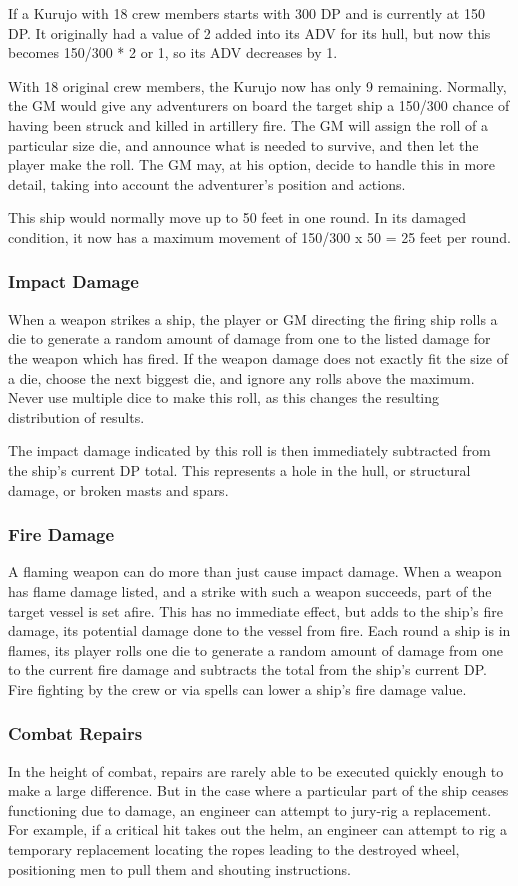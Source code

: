 If a Kurujo with 18 crew members starts with 300 DP and is currently at 150 DP. It originally had a value of 2 added into its ADV for its hull, but now this becomes 150/300 * 2 or 1, so its ADV decreases by 1.

With 18 original crew members, the Kurujo now has only 9 remaining. Normally, the GM would give any adventurers on board the target ship a 150/300 chance of having been struck and killed in artillery fire. The GM will assign the roll of a particular size die, and announce what is needed to survive, and then let the player make the roll. The GM may, at his option, decide to handle this in more detail, taking into account the adventurer's position and actions.

This ship would normally move up to 50 feet in one round. In its damaged condition, it now has a maximum movement of 150/300 x 50 = 25 feet per round.
\subsubsection{Impact Damage}
When a weapon strikes a ship, the player or GM directing the firing ship rolls a die to generate a random amount of damage from one to the listed damage for the weapon which has fired. If the weapon damage does not exactly fit the size of a die, choose the next biggest die, and ignore any rolls above the maximum. Never use multiple dice to make this roll, as this changes the resulting distribution of results.

The impact damage indicated by this roll is then immediately subtracted from the ship's current DP total. This represents a hole in the hull, or structural damage, or broken masts and spars.
\subsubsection{Fire Damage}
A flaming weapon can do more than just cause impact damage. When a weapon has flame damage listed, and a strike with such a weapon succeeds, part of the target vessel is set afire. This has no immediate effect, but adds to the ship's fire damage, its potential damage done to the vessel from fire. Each round a ship is in flames, its player rolls one
die to generate a random amount of damage from one to the
current fire damage and subtracts the total from the ship's
current DP. Fire fighting by the crew or via spells can lower a
ship's fire damage value.
\subsubsection{Combat Repairs}
In the height of combat, repairs are rarely able to be executed quickly enough to make a large difference. But in the case where a particular part of the ship ceases functioning due to damage, an engineer can attempt to jury-rig a replacement. For example, if a critical hit takes out the helm, an engineer can attempt to rig a temporary replacement locating the ropes leading to the destroyed wheel, positioning men to pull them and shouting instructions.

